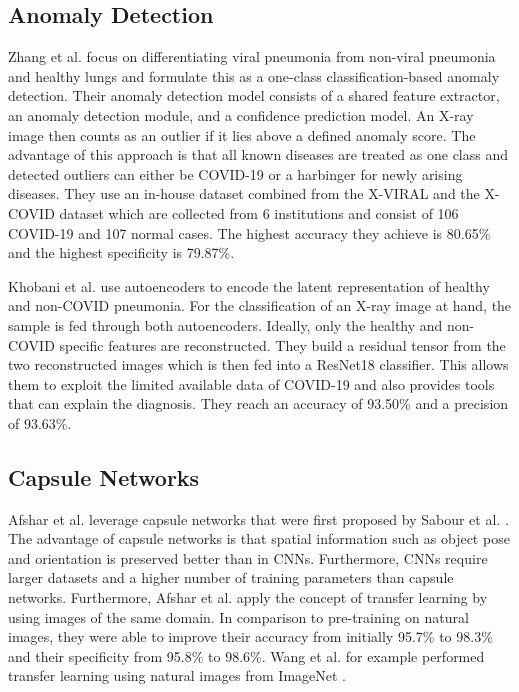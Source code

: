 \documentclass[conference]{IEEEtran}
\begin{document}
\subsection{Anomaly Detection}
Zhang et al. \cite{zhang2020viral} focus on differentiating viral pneumonia from non-viral pneumonia and healthy lungs and formulate this as a one-class classification-based anomaly detection. Their anomaly detection model consists of a shared feature extractor, an anomaly detection module, and a confidence prediction model. An X-ray image then counts as an outlier if it lies above a defined anomaly score. The advantage of this approach is that all known diseases are treated as one class and detected outliers can either be COVID-19 or a harbinger for newly arising diseases. They use an in-house dataset combined from the X-VIRAL and the X-COVID dataset which are collected from 6 institutions and consist of 106 COVID-19 and 107 normal cases. The highest accuracy they achieve is 80.65\% and the highest specificity is 79.87\%.

Khobani et al. \cite{khobahi2020coronet} use autoencoders to encode the latent representation of healthy and non-COVID pneumonia. For the classification of an X-ray image at hand, the sample is fed through both autoencoders. Ideally, only the healthy and non-COVID specific features are reconstructed. They build a residual tensor from the two reconstructed images which is then fed into a ResNet18 classifier. This allows them to exploit the limited available data of COVID-19 and also provides tools that can explain the diagnosis. They reach an accuracy of 93.50\% and a precision of 93.63\%.

\subsection{Capsule Networks}
Afshar et al. \cite{afshar2020covid} leverage capsule networks that were first proposed by Sabour et al. \cite{sabour2017dynamic}. The advantage of capsule networks is that spatial information such as object pose and orientation is preserved better than in CNNs. Furthermore, CNNs require larger datasets and a higher number of training parameters than capsule networks. Furthermore, Afshar et al. apply the concept of transfer learning by using images of the same domain. In comparison to pre-training on natural images, they were able to improve their accuracy from initially 95.7\% to 98.3\% and their specificity from 95.8\% to 98.6\%. Wang et al. for example performed transfer learning using natural images from ImageNet \cite{wang2020covid} \cite{deng2009imagenet}.
\end{document}
